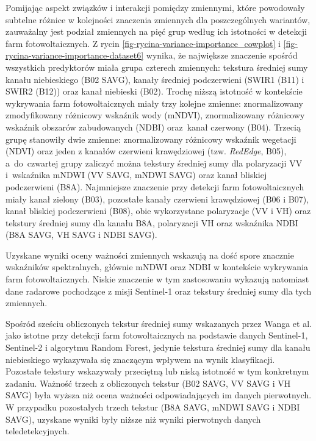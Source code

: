 \documentclass{amuthesis}
\begin{document}
Pomijając aspekt związków i interakcji pomiędzy zmiennymi, które
powodowały subtelne różnice w kolejności znaczenia zmiennych dla
poszczególnych wariantów, zauważalny jest podział zmiennych na pięć grup
według ich istotności w detekcji farm fotowoltaicznych. Z rycin
\ref{fig-rycina-variance-importance_cowplot} i
\ref{fig-rycina-variance-importance-dataset6} wynika, że największe
znaczenie spośród wszystkich predyktorów miała grupa czterech zmiennych:
tekstura średniej sumy kanału niebieskiego (B02 SAVG), kanały średniej
podczerwieni (SWIR1 (B11) i SWIR2 (B12)) oraz kanał niebieski (B02).
Trochę niższą istotność w kontekście wykrywania farm fotowoltaicznych
miały trzy kolejne zmienne: znormalizowany zmodyfikowany różnicowy
wskaźnik wody (mNDVI), znormalizowany różnicowy wskaźnik obszarów
zabudowanych (NDBI) oraz~kanał czerwony (B04). Trzecią grupę stanowiły
dwie zmienne: znormalizowany różnicowy wskaźnik wegetacji (NDVI) oraz
jeden z kanałów czerwieni krawędziowej (tzw. \emph{RedEdge}, B05),
a~do~czwartej grupy zaliczyć można tekstury średniej sumy dla
polaryzacji VV i~wskaźnika mNDWI (VV SAVG, mNDWI SAVG) oraz kanał
bliskiej podczerwieni (B8A). Najmniejsze znaczenie przy detekcji farm
fotowoltaicznych miały kanał zielony (B03), pozostałe kanały czerwieni
krawędziowej (B06 i B07), kanał bliskiej podczerwieni (B08), obie
wykorzystane polaryzacje (VV i VH) oraz tekstury średniej sumy dla
kanału B8A, polaryzacji VH oraz wskaźnika NDBI (B8A SAVG, VH SAVG i NDBI
SAVG).

Uzyskane wyniki oceny ważności zmiennych wskazują na dość spore znacznie
wskaźników spektralnych, głównie mNDWI oraz NDBI w kontekście wykrywania
farm fotowoltaicznych. Niskie znaczenie w tym zastosowaniu wykazują
natomiast dane radarowe pochodzące z misji Sentinel-1 oraz tekstury
średniej sumy dla tych zmiennych.

Spośród sześciu obliczonych tekstur średniej sumy wskazanych przez Wanga
et al. \autocite*{wang_2022_pv} jako istotne przy detekcji farm
fotowoltaicznych na podstawie danych Sentinel-1, Sentinel-2 i algorytmu
Random Forest, jedynie tekstura średniej sumy dla kanału niebieskiego
wykazywała się znaczącym wpływem na wynik klasyfikacji. Pozostałe
tekstury wskazywały przeciętną lub niską istotność w tym konkretnym
zadaniu. Ważność trzech z obliczonych tekstur (B02 SAVG, VV SAVG i VH
SAVG) była wyższa niż ocena ważności odpowiadających im danych
pierwotnych. W przypadku pozostałych trzech tekstur (B8A SAVG, mNDWI
SAVG i NDBI SAVG), uzyskane wyniki były niższe niż wyniki pierwotnych
danych teledetekcyjnych.
\end{document}
